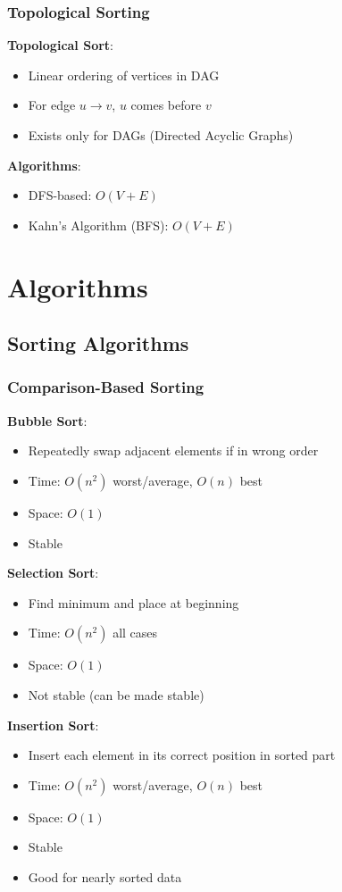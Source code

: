 \documentclass[12pt,a4paper]{report}
\begin{document}
\subsection{Topological Sorting}
\begin{concept}
\textbf{Topological Sort}:
\begin{itemize}
    \item Linear ordering of vertices in DAG
    \item For edge $u \to v$, $u$ comes before $v$
    \item Exists only for DAGs (Directed Acyclic Graphs)
\end{itemize}

\textbf{Algorithms}:
\begin{itemize}
    \item DFS-based: $O(V + E)$
    \item Kahn's Algorithm (BFS): $O(V + E)$
\end{itemize}
\end{concept}

\chapter{Algorithms}

\section{Sorting Algorithms}

\subsection{Comparison-Based Sorting}
\begin{concept}
\textbf{Bubble Sort}:
\begin{itemize}
    \item Repeatedly swap adjacent elements if in wrong order
    \item Time: $O(n^2)$ worst/average, $O(n)$ best
    \item Space: $O(1)$
    \item Stable
\end{itemize}

\textbf{Selection Sort}:
\begin{itemize}
    \item Find minimum and place at beginning
    \item Time: $O(n^2)$ all cases
    \item Space: $O(1)$
    \item Not stable (can be made stable)
\end{itemize}

\textbf{Insertion Sort}:
\begin{itemize}
    \item Insert each element in its correct position in sorted part
    \item Time: $O(n^2)$ worst/average, $O(n)$ best
    \item Space: $O(1)$
    \item Stable
    \item Good for nearly sorted data
\end{itemize}
\end{concept}
\end{document}
